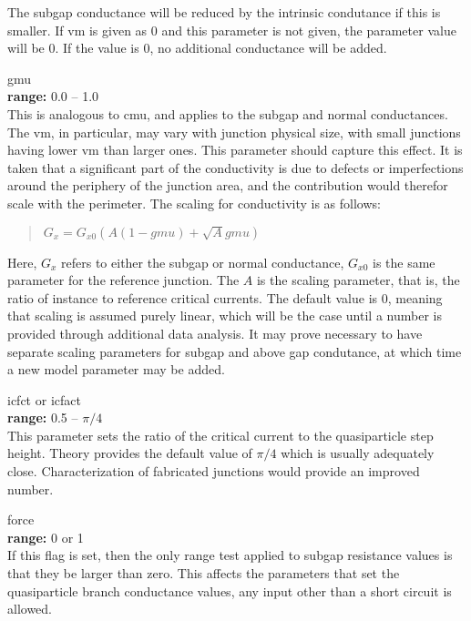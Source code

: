 \begin{description}
The subgap conductance will be reduced by the intrinsic condutance if
this is smaller.  If {\vt vm} is given as 0 and this parameter is not
given, the parameter value will be 0.  If the value is 0, no
additional conductance will be added.

\item{\vt gmu}\\
{\bf range:} 0.0 -- 1.0\\
This is analogous to {\vt cmu}, and applies to the subgap and normal
conductances.  The {\vt vm}, in particular, may vary with junction
physical size, with small junctions having lower {\vt vm} than larger
ones.  This parameter should capture this effect.  It is taken that a
significant part of the conductivity is due to defects or
imperfections around the periphery of the junction area, and the
contribution would therefor scale with the perimeter.  The scaling for
conductivity is as follows:
\begin{quote}
$G_x = G_{x0} (A(1-gmu) + \sqrt{A} gmu)$
\end{quote}
Here, $G_x$ refers to either the subgap or normal conductance,
$G_{x0}$ is the same parameter for the reference junction.  The $A$ is
the scaling parameter, that is, the ratio of instance to reference
critical currents.  The default value is 0, meaning that scaling is
assumed purely linear, which will be the case until a number is
provided through additional data analysis.  It may prove necessary to
have separate scaling parameters for subgap and above gap condutance,
at which time a new model parameter may be added.

\item{{\vt icfct} or {\vt icfact}}\\
{\bf range:} 0.5 -- ${\pi}/4$\\
This parameter sets the ratio of the critical current to the
quasiparticle step height.  Theory provides the default value of
$\pi/4$ which is usually adequately close.  Characterization of
fabricated junctions would provide an improved number.

\item{\vt force}\\
{\bf range:} 0 or 1\\
If this flag is set, then the only range test applied to subgap
resistance values is that they be larger than zero.  This affects the
parameters that set the quasiparticle branch conductance values, any
input other than a short circuit is allowed.


\end{description}
